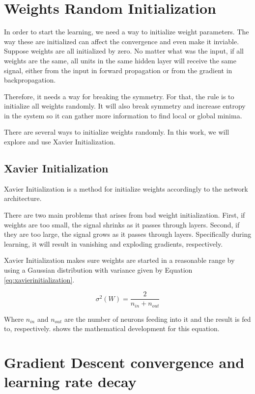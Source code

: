 \section{Weights Random Initialization}
In order to start the learning, we need a way to initialize weight parameters. The way these are initialized can affect the convergence and even make it inviable.
Suppose weights are all initialized by zero. No matter what was the input, if all weights are the same, all units in the same hidden layer will receive the same signal, either from the input in forward propagation or from the gradient in backpropagation. 

Therefore, it needs a way for breaking the symmetry. For that, the rule is to initialize all weights randomly. It will also break symmetry and increase entropy in the system so it can gather more information to find local or global minima.

There are several ways to initialize weights randomly. In this work, we will explore and use Xavier Initialization.


\subsection{Xavier Initialization}

Xavier Initialization \cite{Glorot10} is a method for initialize weights accordingly to the network architecture. 

There are two main problems that arises from bad weight initialization. First, if weights are too small, the signal shrinks as it passes through layers. Second, if they are too large, the signal grows as it passes through layers. Specifically during learning, it will result in vanishing and exploding gradients, respectively.

Xavier Initialization makes sure weights are started in a reasonable range by using a Gaussian distribution with variance given by Equation \ref{eq:xavierinitialization}.

\begin{equation}\label{eq:xavierinitialization}
	\sigma^{2}(W) = \frac{2}{n_{in} + n_{out}}
\end{equation}

Where $n_{in}$ and $n_{out}$ are the number of neurons feeding into it and the result is fed to, respectively. \citeauthor{Glorot10} shows the mathematical development for this equation.

\section{Gradient Descent convergence and learning rate decay}


